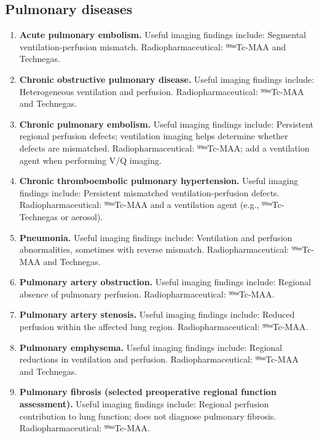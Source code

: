 \subsection{Pulmonary diseases}
\begin{enumerate}[leftmargin=*,itemsep=0.45em,topsep=0.4em]
\item \textbf{Acute pulmonary embolism.} Useful imaging findings include: Segmental ventilation-perfusion mismatch. Radiopharmaceutical: ⁹⁹ᵐTc-MAA and Technegas.
\item \textbf{Chronic obstructive pulmonary disease.} Useful imaging findings include: Heterogeneous ventilation and perfusion. Radiopharmaceutical: ⁹⁹ᵐTc-MAA and Technegas.
\item \textbf{Chronic pulmonary embolism.} Useful imaging findings include: Persistent regional perfusion defects; ventilation imaging helps determine whether defects are mismatched. Radiopharmaceutical: ⁹⁹ᵐTc-MAA; add a ventilation agent when performing V/Q imaging.
\item \textbf{Chronic thromboembolic pulmonary hypertension.} Useful imaging findings include: Persistent mismatched ventilation-perfusion defects. Radiopharmaceutical: ⁹⁹ᵐTc-MAA and a ventilation agent (e.g., ⁹⁹ᵐTc-Technegas or aerosol).
\item \textbf{Pneumonia.} Useful imaging findings include: Ventilation and perfusion abnormalities, sometimes with reverse mismatch. Radiopharmaceutical: ⁹⁹ᵐTc-MAA and Technegas.
\item \textbf{Pulmonary artery obstruction.} Useful imaging findings include: Regional absence of pulmonary perfusion. Radiopharmaceutical: ⁹⁹ᵐTc-MAA.
\item \textbf{Pulmonary artery stenosis.} Useful imaging findings include: Reduced perfusion within the affected lung region. Radiopharmaceutical: ⁹⁹ᵐTc-MAA.
\item \textbf{Pulmonary emphysema.} Useful imaging findings include: Regional reductions in ventilation and perfusion. Radiopharmaceutical: ⁹⁹ᵐTc-MAA and Technegas.
\item \textbf{Pulmonary fibrosis (selected preoperative regional function assessment).} Useful imaging findings include: Regional perfusion contribution to lung function; does not diagnose pulmonary fibrosis. Radiopharmaceutical: ⁹⁹ᵐTc-MAA.
\end{enumerate}

